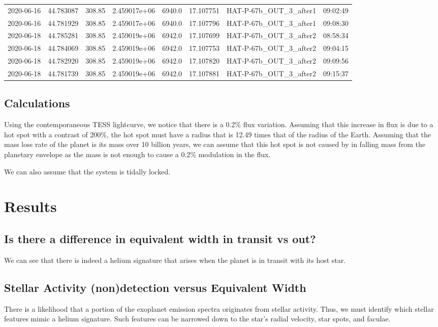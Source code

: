 \documentclass[modern]{aastex631}
\begin{document}
\begin{tabular}{lrrrlrll}
    2020-06-16 & 44.783087   & 308.85        & 2.459017e+06 & 6940.0 & 17.107751 & HAT-P-67b\_OUT\_3\_after1  & 09:02:49 \\
    2020-06-16 & 44.781929   & 308.85        & 2.459017e+06 & 6940.0 & 17.107796 & HAT-P-67b\_OUT\_3\_after1  & 09:08:30 \\
    2020-06-18 & 44.785281   & 308.85        & 2.459019e+06 & 6942.0 & 17.107699 & HAT-P-67b\_OUT\_3\_after2  & 08:58:34 \\
    2020-06-18 & 44.784069   & 308.85        & 2.459019e+06 & 6942.0 & 17.107753 & HAT-P-67b\_OUT\_3\_after2  & 09:04:15 \\
    2020-06-18 & 44.782920   & 308.85        & 2.459019e+06 & 6942.0 & 17.107820 & HAT-P-67b\_OUT\_3\_after2  & 09:09:56 \\
    2020-06-18 & 44.781739   & 308.85        & 2.459019e+06 & 6942.0 & 17.107881 & HAT-P-67b\_OUT\_3\_after2  & 09:15:37 \\
    \bottomrule
\end{tabular}

\subsection{Calculations}
Using the contemporaneous TESS lightcurve, we notice that there is a 0.2\% flux variation. Assuming that this increase in flux is due to a hot spot with a contrast of 200\%, the hot spot must have a radius that is 12.49 times that of the radius of the Earth. Assuming that the mass loss rate of the planet is its mass over 10 billion years, we can assume that this hot spot is not caused by in falling mass from the planetary envelope as the mass is not enough to cause a 0.2\% modulation in the flux.

We can also assume that the system is tidally locked.

\section{Results}
\subsection{Is there a difference in equivalent width in transit vs out?}
We can see that there is indeed a helium signature that arises when the planet is in transit with its host star.
\subsection{Stellar Activity (non)detection versus Equivalent Width}
There is a likelihood that a portion of the exoplanet emission spectra originates from stellar activity. Thus, we must identify which stellar features mimic a helium signature. Such features can be narrowed down to the star's radial velocity, star spots, and faculae.
\end{document}
